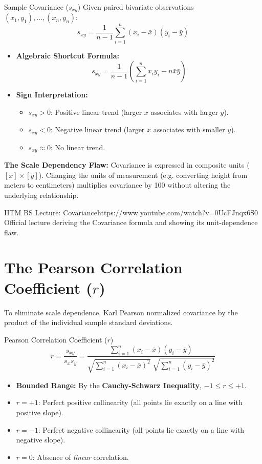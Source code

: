 \begin{definitionbox}{Sample Covariance ($s_{xy}$)}
Given paired bivariate observations $(x_1, y_1), \dots, (x_n, y_n)$:
$$s_{xy} = \frac{1}{n-1} \sum_{i=1}^n (x_i - \bar{x})(y_i - \bar{y})$$
\begin{itemize}
    \item \textbf{Algebraic Shortcut Formula:}
    $$s_{xy} = \frac{1}{n-1} \left( \sum_{i=1}^n x_i y_i - n\bar{x}\bar{y} \right)$$
    \item \textbf{Sign Interpretation:}
    \begin{itemize}
        \item $s_{xy} > 0$: Positive linear trend (larger $x$ associates with larger $y$).
        \item $s_{xy} < 0$: Negative linear trend (larger $x$ associates with smaller $y$).
        \item $s_{xy} \approx 0$: No linear trend.
    \end{itemize}
\end{itemize}
\textbf{The Scale Dependency Flaw:} Covariance is expressed in composite units ($[x] \times [y]$). Changing the units of measurement (e.g. converting height from meters to centimeters) multiplies covariance by 100 without altering the underlying relationship.
\end{definitionbox}

\begin{videocard}{IITM BS Lecture: Covariance}{https://www.youtube.com/watch?v=0UcFJnqx6S0}
Official lecture deriving the Covariance formula and showing its unit-dependence flaw.
\end{videocard}

\section{The Pearson Correlation Coefficient ($r$)}

To eliminate scale dependence, Karl Pearson normalized covariance by the product of the individual sample standard deviations.

\begin{definitionbox}{Pearson Correlation Coefficient ($r$)}
$$r = \frac{s_{xy}}{s_x s_y} = \frac{\sum_{i=1}^n (x_i - \bar{x})(y_i - \bar{y})}{\sqrt{\sum_{i=1}^n (x_i - \bar{x})^2}\;\sqrt{\sum_{i=1}^n (y_i - \bar{y})^2}}$$
\begin{itemize}
    \item \textbf{Bounded Range:} By the \textbf{Cauchy-Schwarz Inequality}, $-1 \le r \le +1$.
    \item $r = +1$: Perfect positive collinearity (all points lie exactly on a line with positive slope).
    \item $r = -1$: Perfect negative collinearity (all points lie exactly on a line with negative slope).
    \item $r = 0$: Absence of \emph{linear} correlation.
\end{itemize}
\end{definitionbox}

